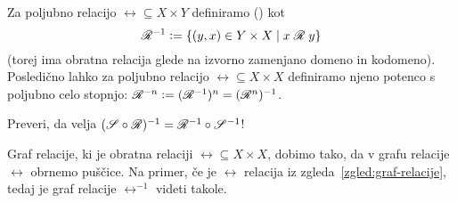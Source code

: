                 Za poljubno relacijo $\rel \subseteq X \times Y$ definiramo  ()  kot
                \[\rel^{-1} \dfeq \set{(y, x) \in Y \times X}{\rel[x][y]}\]
                (torej ima obratna relacija glede na izvorno zamenjano domeno in kodomeno). Posledično lahko za poljubno relacijo $\rel \subseteq X \times X$ definiramo njeno potenco s poljubno celo stopnjo: $\rel^{-n} \dfeq (\rel^{-1})^n = (\rel^n)^{-1}$.

                \begin{naloga}
                        Preveri, da velja $(\srel \circ \rel)^{-1} = \rel^{-1} \circ \srel^{-1}$!
                \end{naloga}

                \begin{zgled}
                        Graf relacije, ki je obratna relaciji $\rel \subseteq X \times X$, dobimo tako, da v grafu relacije $\rel$ obrnemo puščice. Na primer, če je $\rel$ relacija iz zgleda~\ref{zgled:graf-relacije}, tedaj je graf relacije $\rel^{-1}$ videti takole.

                \end{zgled}

